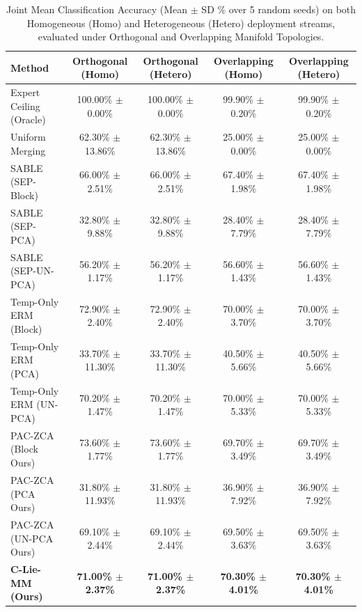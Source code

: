 \begin{table}[t]
\centering
\caption{Joint Mean Classification Accuracy (Mean $\pm$ SD \% over 5 random seeds) on both Homogeneous (Homo) and Heterogeneous (Hetero) deployment streams, evaluated under Orthogonal and Overlapping Manifold Topologies.}
\label{tab:main_results}
\vskip 0.15in
\begin{small}
\begin{sc}
\begin{tabular}{lcccc}
\toprule
Method & Orthogonal (Homo) & Orthogonal (Hetero) & Overlapping (Homo) & Overlapping (Hetero) \\
\midrule
Expert Ceiling (Oracle) & 100.00\% $\pm$ 0.00\% & 100.00\% $\pm$ 0.00\% & 99.90\% $\pm$ 0.20\% & 99.90\% $\pm$ 0.20\% \\
Uniform Merging         & 62.30\% $\pm$ 13.86\% & 62.30\% $\pm$ 13.86\% & 25.00\% $\pm$ 0.00\% & 25.00\% $\pm$ 0.00\% \\
\midrule
SABLE (SEP-Block)       & 66.00\% $\pm$ 2.51\%  & 66.00\% $\pm$ 2.51\%  & 67.40\% $\pm$ 1.98\%  & 67.40\% $\pm$ 1.98\%  \\
SABLE (SEP-PCA)         & 32.80\% $\pm$ 9.88\%  & 32.80\% $\pm$ 9.88\%  & 28.40\% $\pm$ 7.79\%  & 28.40\% $\pm$ 7.79\%  \\
SABLE (SEP-UN-PCA)     & 56.20\% $\pm$ 1.17\%  & 56.20\% $\pm$ 1.17\%  & 56.60\% $\pm$ 1.43\%  & 56.60\% $\pm$ 1.43\%  \\
\midrule
Temp-Only ERM (Block)   & 72.90\% $\pm$ 2.40\%  & 72.90\% $\pm$ 2.40\%  & 70.00\% $\pm$ 3.70\%  & 70.00\% $\pm$ 3.70\%  \\
Temp-Only ERM (PCA)     & 33.70\% $\pm$ 11.30\% & 33.70\% $\pm$ 11.30\% & 40.50\% $\pm$ 5.66\%  & 40.50\% $\pm$ 5.66\%  \\
Temp-Only ERM (UN-PCA)  & 70.20\% $\pm$ 1.47\%  & 70.20\% $\pm$ 1.47\%  & 70.00\% $\pm$ 5.33\%  & 70.00\% $\pm$ 5.33\%  \\
\midrule
PAC-ZCA (Block Ours)    & 73.60\% $\pm$ 1.77\%  & 73.60\% $\pm$ 1.77\%  & 69.70\% $\pm$ 3.49\%  & 69.70\% $\pm$ 3.49\%  \\
PAC-ZCA (PCA Ours)      & 31.80\% $\pm$ 11.93\% & 31.80\% $\pm$ 11.93\% & 36.90\% $\pm$ 7.92\%  & 36.90\% $\pm$ 7.92\%  \\
PAC-ZCA (UN-PCA Ours)   & 69.10\% $\pm$ 2.44\%  & 69.10\% $\pm$ 2.44\%  & 69.50\% $\pm$ 3.63\%  & 69.50\% $\pm$ 3.63\%  \\
\midrule
\textbf{C-Lie-MM (Ours)} & \textbf{71.00\% $\pm$ 2.37\%} & \textbf{71.00\% $\pm$ 2.37\%} & \textbf{70.30\% $\pm$ 4.01\%} & \textbf{70.30\% $\pm$ 4.01\%} \\
\bottomrule
\end{tabular}
\end{sc}
\end{small}
\end{table}

